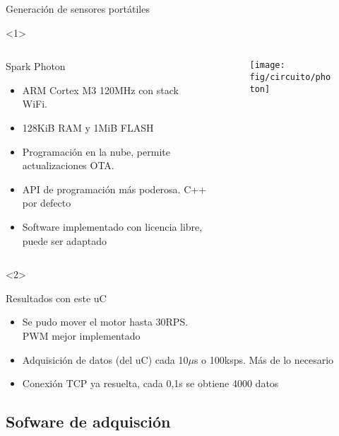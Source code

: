 \begin{frame}{Generación de sensores portátiles}
\begin{onlyenv}<1>
    \begin{columns}[c]
        \begin{column}{.5\textwidth}
        Spark Photon
        \begin{itemize}
            \item ARM Cortex M3 120MHz con stack WiFi. 
            \item 128KiB RAM y 1MiB FLASH
            \item Programación en la nube, permite actualizaciones OTA.
            \item API de programación más poderosa. C++ por defecto
            \item Software implementado con licencia libre, puede ser adaptado
        \end{itemize}
        \end{column}

        \begin{column}{.2\textwidth}
            \begin{figure}
                \texttt{[image: fig/circuito/photon]}
                \label{fig:circuito/photon}
            \end{figure}
        \end{column}
    \end{columns}
\end{onlyenv}

\begin{onlyenv}<2>
    \begin{block}{Resultados con este uC}
        \begin{itemize}
            \item Se pudo mover el motor hasta 30RPS. \\PWM mejor implementado
            \item Adquisición de datos (del uC) cada 10$\mu$s o 100ksps. Más de lo necesario
            \item Conexión TCP ya resuelta, cada 0,1s se obtiene 4000 datos
        \end{itemize}
    \end{block}
\end{onlyenv}

\end{frame}

\subsection{Sofware de adquisción}

